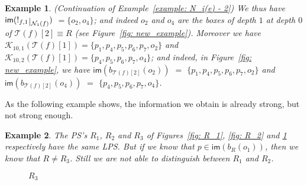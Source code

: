 \documentclass{article}
\theoremstyle{plain}
\newtheorem{definition}{Definition}
\newtheorem{example}{Example}
\newcommand{\Nat}{\ensuremath{\mathbb{N}}}
\newcommand{\taylor}[2]{\mathcal{T}(#1)[#2]}
\newcommand{\criticalports}[3]{\mathcal{K}_{#2, #3}(#1)}
\newcommand{\cosize}[1]{\textit{cosize}(#1)}
\newcommand{\depthof}[1]{\textit{depth}(#1)}
\def\restriction#1#2{\mathchoice
              {\setbox1\hbox{${\displaystyle #1}_{\scriptstyle #2}$}
              \restrictionaux{#1}{#2}}
              {\setbox1\hbox{${\textstyle #1}_{\scriptstyle #2}$}
              \restrictionaux{#1}{#2}}
              {\setbox1\hbox{${\scriptstyle #1}_{\scriptscriptstyle #2}$}
              \restrictionaux{#1}{#2}}
              {\setbox1\hbox{${\scriptscriptstyle #1}_{\scriptscriptstyle #2}$}
              \restrictionaux{#1}{#2}}}
\def\restrictionaux#1#2{{#1\,\smash{\vrule height .8\ht1 depth .85\dp1}}_{\,#2}}
\newcommand{\im}[1]{\textsf{im}(#1)}
\newcommand{\portsatzero}[1]{\mathcal{P}_0(#1)}
\newcommand{\Card}[1]{\textsf{Card}\left( #1 \right)}
\newcommand{\conclusionscirc}[1]{\mathcal{P}_\circ^{\textsf{f}}(#1)}
\newcommand{\boxes}[1]{\mathcal{B}(#1)}
\newcommand{\exactboxesatzero}[2]{\mathcal{B}_{0}^{=#2}(#1)}
\newcommand{\boxesatzerogeq}[2]{\mathcal{B}_0^{\geq #2}(#1)}
\newcommand{\scalefactter}{0.33}
\newcommand{\pictter}[1]{\scalebox{\scalefactter}{}}
\begin{document}
\begin{example}
(Continuation of Example~\ref{example: N_i(e) - 2}) We thus have $\im{\restriction{!_{f, 1}}{\mathcal{N}_1(f)}}$ $= \{ o_2, o_4 \}$; and indeed $o_2$ and $o_4$ are the boxes of depth $1$ at depth $0$ of $\taylor{f}{2} \equiv R$ (see Figure~\ref{fig: new_example}). Moreover we have $\criticalports{\taylor{f}{1}}{10}{1} = \{ p_1, p_4, p_5, p_6, p_7, o_2 \}$ and $\criticalports{\taylor{f}{1}}{10}{2} = \{ p_4, p_5, p_6, p_7, o_4 \}$; and indeed, in Figure~\ref{fig: new_example}, we have $\im{b_{\taylor{f}{2}}(o_2)}$ $=$ $\{ p_1, p_4, p_5, p_6, p_7, o_2 \}$ and $\im{b_{\taylor{f}{2}}(o_4)}$ $=$ $\{ p_4, p_5, p_6, p_7, o_4 \}$.
\end{example}

\begin{comment}
Notice, thanks to Proposition~\ref{prop: critical ports below new boxes}, that the set $\criticalports{\taylor{e}{i}}{k}{\mathcal{N}_i(e)} \cap \portsatzero{R}$ does not depend on $e$ and $k$; it is the set $\mathcal{K}_i(R)$ defined as follows:

\begin{definition}
Let $R$ be a $\circ$-PS. Let $k > \Card{\boxes{R}{}}, \cosize{R}$.  Let $i \in \Nat$. We define, by induction on $\depthof{R}$ the set $\mathcal{K}_i(R) \subseteq \portsatzero{R}$ as follows: 
$\mathcal{K}_i(R) =$ $\bigcup_{o_1 \in \exactboxesatzero{R}{i}} \im{b_R(o_1)}$ \\$\cup$ $\bigcup_{o_1 \in \boxesatzerogeq{R}{i+1}} (\mathcal{K}_i(B_R(o_1)) \cap \conclusionscirc{B_R(o_1)})$
\end{definition}
\end{comment}

As the following example shows, the information we obtain is already strong, but not strong enough.

\begin{example}
The PS's $R_1$, $R_2$ and $R_3$ of Figures~\ref{fig: R_1}, \ref{fig: R_2} and \ref{fig: R_3} respectively have the same LPS. But if we know that $p \in \im{b_R(o_1)}$, then we know that $R \not= R_3$. Still we are not able to distinguish between $R_1$ and $R_2$.

\begin{figure}
\centering
\begin{minipage}{0.3\textwidth}
\centering
\pictter{R_1}
\caption{$R_1$}
\label{fig: R_1}
\end{minipage}\hfill
\begin{minipage}{0.3\textwidth}
\centering
\pictter{R_2}
\caption{$R_2$}
\label{fig: R_2}
\end{minipage}
\begin{minipage}{0.3\textwidth}
\centering
\pictter{R_3}
\caption{$R_3$}
\label{fig: R_3}
\end{minipage}
\end{figure}
\end{example}
\end{document}
